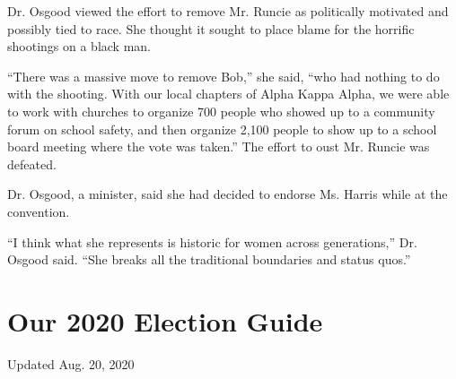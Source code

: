 Dr. Osgood viewed the effort to remove Mr. Runcie as politically
motivated and possibly tied to race. She thought it sought to place
blame for the horrific shootings on a black man.

``There was a massive move to remove Bob,'' she said, ``who had nothing
to do with the shooting. With our local chapters of Alpha Kappa Alpha,
we were able to work with churches to organize 700 people who showed up
to a community forum on school safety, and then organize 2,100 people to
show up to a school board meeting where the vote was taken.'' The effort
to oust Mr. Runcie was defeated.

Dr. Osgood, a minister, said she had decided to endorse Ms. Harris while
at the convention.

``I think what she represents is historic for women across
generations,'' Dr. Osgood said. ``She breaks all the traditional
boundaries and status quos.''

\hypertarget{our-2020-election-guide}{%
\section{Our 2020 Election Guide}\label{our-2020-election-guide}}

Updated Aug. 20, 2020

